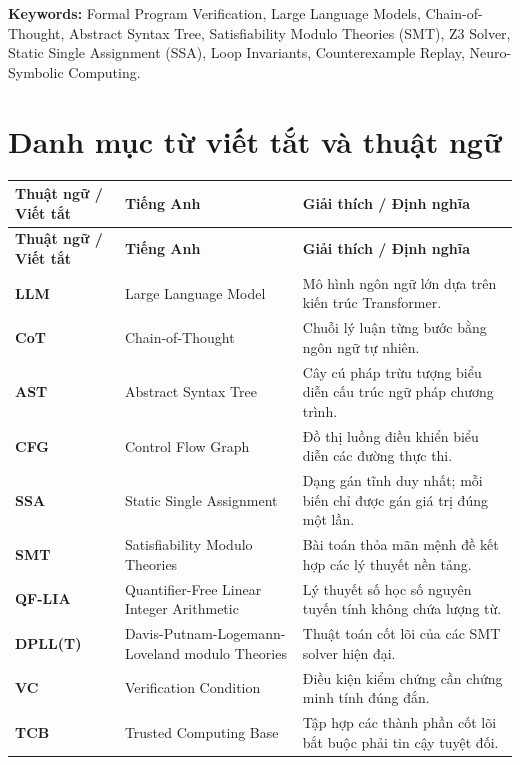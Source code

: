 \vspace{0.5cm}
\noindent\textbf{Keywords:} Formal Program Verification, Large Language Models, Chain-of-Thought, Abstract Syntax Tree, Satisfiability Modulo Theories (SMT), Z3 Solver, Static Single Assignment (SSA), Loop Invariants, Counterexample Replay, Neuro-Symbolic Computing.

\chapter*{Danh mục từ viết tắt và thuật ngữ}

\begin{center}
\renewcommand{\arraystretch}{1.2}
\begin{longtable}{|p{}|p{}|p{}|}
\hline
\textbf{Thuật ngữ / Viết tắt} & \textbf{Tiếng Anh} & \textbf{Giải thích / Định nghĩa} \\
\hline
\endfirsthead
\hline
\textbf{Thuật ngữ / Viết tắt} & \textbf{Tiếng Anh} & \textbf{Giải thích / Định nghĩa} \\
\hline
\endhead
\hline
\endfoot
\textbf{LLM} & Large Language Model & Mô hình ngôn ngữ lớn dựa trên kiến trúc Transformer. \\
\hline
\textbf{CoT} & Chain-of-Thought & Chuỗi lý luận từng bước bằng ngôn ngữ tự nhiên. \\
\hline
\textbf{AST} & Abstract Syntax Tree & Cây cú pháp trừu tượng biểu diễn cấu trúc ngữ pháp chương trình. \\
\hline
\textbf{CFG} & Control Flow Graph & Đồ thị luồng điều khiển biểu diễn các đường thực thi. \\
\hline
\textbf{SSA} & Static Single Assignment & Dạng gán tĩnh duy nhất; mỗi biến chỉ được gán giá trị đúng một lần. \\
\hline
\textbf{SMT} & Satisfiability Modulo Theories & Bài toán thỏa mãn mệnh đề kết hợp các lý thuyết nền tảng. \\
\hline
\textbf{QF-LIA} & Quantifier-Free Linear Integer Arithmetic & Lý thuyết số học số nguyên tuyến tính không chứa lượng từ. \\
\hline
\textbf{DPLL(T)} & Davis-Putnam-Logemann-Loveland modulo Theories & Thuật toán cốt lõi của các SMT solver hiện đại. \\
\hline
\textbf{VC} & Verification Condition & Điều kiện kiểm chứng cần chứng minh tính đúng đắn. \\
\hline
\textbf{TCB} & Trusted Computing Base & Tập hợp các thành phần cốt lõi bắt buộc phải tin cậy tuyệt đối. \\

\end{longtable}
\end{center}
